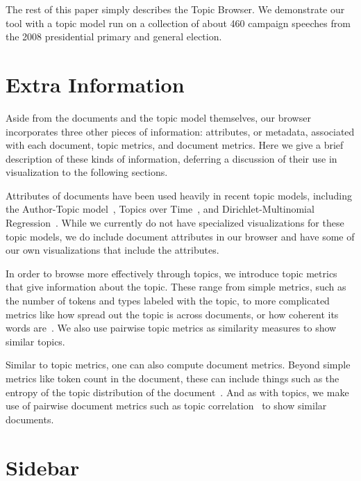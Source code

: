 \documentclass{article}
\begin{document}
The rest of this paper simply describes the Topic Browser.  We demonstrate our
tool with a topic model run on a collection of about 460 campaign speeches from
the 2008 presidential primary and general election.

\section{Extra Information}

Aside from the documents and the topic model themselves, our browser
incorporates three other pieces of information: attributes, or metadata,
associated with each document, topic metrics, and document metrics.  Here we
give a brief description of these kinds of information, deferring a discussion
of their use in visualization to the following sections.

Attributes of documents have been used heavily in recent topic models,
including the Author-Topic model~\cite{rosen-zvi-2004-author-topic-model},
Topics over Time~\cite{wang-2006-topics-over-time}, and Dirichlet-Multinomial
Regression~\cite{mimno-2008-topic-models-with-arbitrary-features-dmr}.  While
we currently do not have specialized visualizations for these topic models, we
do include document attributes in our browser and have some of our own 
visualizations that include the attributes.

In order to browse more effectively through topics, we introduce topic metrics
that give information about the topic.  These range from simple metrics, such
as the number of tokens and types labeled with the topic, to more complicated
metrics like how spread out the topic is across documents, or how coherent its
words are~\cite{newman-2010-automatic-evaluation-of-topic-coherence}.  We also
use pairwise topic metrics as similarity measures to show similar topics.

Similar to topic metrics, one can also compute document metrics.  Beyond simple
metrics like token count in the document, these can include things such as the
entropy of the topic distribution of the
document~\cite{misra-2008-lda-to-find-semantically-incoherent-documents}.  And
as with topics, we make use of pairwise document metrics such as topic
correlation~\cite{blei-2009-topic-models} to show similar documents.

\section{Sidebar}
\end{document}
